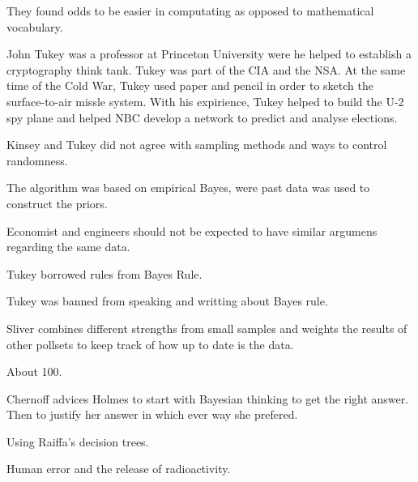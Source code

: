\documentclass[12pt]{article}
\begin{document}
\begin{enumerate}
They found odds to be easier in computating as opposed to mathematical vocabulary.


John Tukey was a professor at Princeton University were he helped to establish a cryptography think tank.
Tukey was part of the CIA and the NSA. At the same time of the Cold War, Tukey used paper and pencil in order to sketch the surface-to-air missle system. With his expirience, Tukey helped to build the U-2 spy plane and helped NBC develop a network to predict and analyse elections. 


Kinsey and Tukey did not agree with sampling methods and ways to control randomness.


The algorithm was based on empirical Bayes, were past data was used to construct the priors.


Economist and engineers should not be expected to have similar argumens regarding the same data. 


Tukey borrowed rules from Bayes Rule. 


Tukey was banned from speaking and writting about Bayes rule.


Sliver combines different strengths from small samples and weights the results of other pollsets to keep track of how up to date is the data. 


About 100.


Chernoff advices Holmes to start with Bayesian thinking to get the right answer. Then to justify her answer in which ever way she prefered. 


Using Raiffa's decision trees. 


Human error and the release of radioactivity. 

\end{enumerate}
\end{document}
